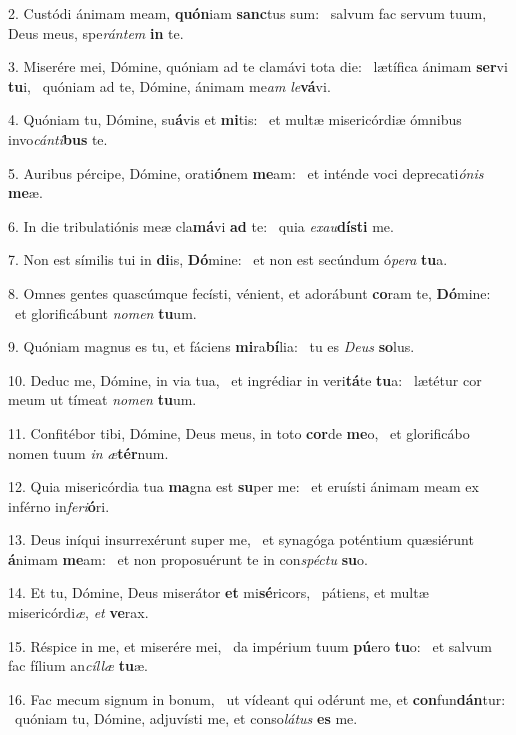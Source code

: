 2. Custódi ánimam meam, \textbf{quón}iam \textbf{sanc}tus sum: \ast\  salvum fac servum tuum, Deus meus, spe\textit{rán}\textit{tem} \textbf{in} te.\

3. Miserére mei, Dómine, quóniam ad te clamávi tota die: \dag\  lætífica ánimam \textbf{ser}vi \textbf{tu}i, \ast\  quóniam ad te, Dómine, ánimam me\textit{am} \textit{le}\textbf{vá}vi.\

4. Quóniam tu, Dómine, su\textbf{á}vis et \textbf{mi}tis: \ast\  et multæ misericórdiæ ómnibus invo\textit{cán}\textit{ti}\textbf{bus} te.\

5. Auribus pércipe, Dómine, orati\textbf{ó}nem \textbf{me}am: \ast\  et inténde voci deprecati\textit{ó}\textit{nis} \textbf{me}æ.\

6. In die tribulatiónis meæ cla\textbf{má}vi \textbf{ad} te: \ast\  quia \textit{ex}\textit{au}\textbf{dís}\textbf{ti} me.\

7. Non est símilis tui in \textbf{di}is, \textbf{Dó}mine: \ast\  et non est secúndum ó\textit{pe}\textit{ra} \textbf{tu}a.\

8. Omnes gentes quascúmque fecísti, vénient, et adorábunt \textbf{co}ram te, \textbf{Dó}mine: \ast\  et glorificábunt \textit{no}\textit{men} \textbf{tu}um.\

9. Quóniam magnus es tu, et fáciens \textbf{mi}ra\textbf{bí}lia: \ast\  tu es \textit{De}\textit{us} \textbf{so}lus.\

10. Deduc me, Dómine, in via tua, \dag\  et ingrédiar in veri\textbf{tá}te \textbf{tu}a: \ast\  lætétur cor meum ut tímeat \textit{no}\textit{men} \textbf{tu}um.\

11. Confitébor tibi, Dómine, Deus meus, in toto \textbf{cor}de \textbf{me}o, \ast\  et glorificábo nomen tuum \textit{in} \textit{æ}\textbf{tér}num.\

12. Quia misericórdia tua \textbf{ma}gna est \textbf{su}per me: \ast\  et eruísti ánimam meam ex inférno in\textit{fe}\textit{ri}\textbf{ó}ri.\

13. Deus iníqui insurrexérunt super me, \dag\  et synagóga poténtium quæsiérunt \textbf{á}nimam \textbf{me}am: \ast\  et non proposuérunt te in con\textit{spéc}\textit{tu} \textbf{su}o.\

14. Et tu, Dómine, Deus miserátor \textbf{et} mi\textbf{sé}ricors, \ast\  pátiens, et multæ misericórdi\textit{æ}, \textit{et} \textbf{ve}rax.\

15. Réspice in me, et miserére mei, \dag\  da impérium tuum \textbf{pú}ero \textbf{tu}o: \ast\  et salvum fac fílium an\textit{cíl}\textit{læ} \textbf{tu}æ.\

16. Fac mecum signum in bonum, \dag\  ut vídeant qui odérunt me, et \textbf{con}fun\textbf{dán}tur: \ast\  quóniam tu, Dómine, adjuvísti me, et conso\textit{lá}\textit{tus} \textbf{es} me.\

